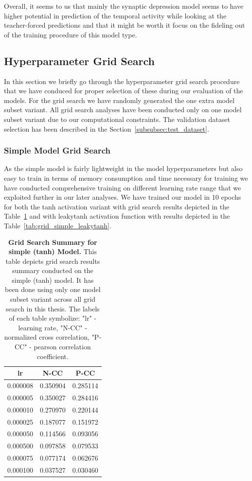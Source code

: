 Overall, it seems to us that mainly the synaptic depression model seems to have higher potential in prediction of the temporal activity while looking at the teacher-forced predictions and that it might be worth it focus on the fideling out of the training procedure of this model type.

\subsection{Hyperparameter Grid Search}
\label{subsec:hyperparameter_grid_search}

In this section we briefly go through the hyperparameter grid search procedure that we have conduced for proper selection of these during our evaluation of the models. For the grid search we have randomly generated the one extra model subset variant. All grid search analyses have been conducted only on one model subset variant due to our computational constraints. The validation dataset selection has been described in the Section~\ref{subsubsec:test_dataset}.

\subsubsection{Simple Model Grid Search}
\label{subsubsec:simple_model_grid_search}
As the simple model is fairly lightweight in the model hyperparameters but also easy to train in terms of memory consumption and time necessary for training we have conducted comprehensive training on different learning rate range that we exploited further in our later analyses. We have trained our model in 10 epochs for both the tanh activation variant with grid search results depicted in the Table~\ref{tab:grid_simple_tanh} and with leakytanh activation function with results depicted in the Table~\ref{tab:grid_simple_leakytanh}.

\begin{table}
    \centering\footnotesize\sf
    \begin{tabular}{ccc}
    \toprule
    lr & N-CC & P-CC \\
    \midrule
    0.000008 & 0.350904 & 0.285114 \\
    0.000005 & 0.350027 & 0.284416 \\
    0.000010 & 0.270970 & 0.220144 \\
    0.000025 & 0.187077 & 0.151972 \\
    0.000050 & 0.114566 & 0.093056 \\
    0.000500 & 0.097858 & 0.079533 \\
    0.000075 & 0.077174 & 0.062676 \\
    0.000100 & 0.037527 & 0.030460 \\
    \bottomrule
    \end{tabular}
    \caption{\textbf{Grid Search Summary for simple (tanh) Model.} This table depicts grid search results summary conducted on the simple (tanh) model. It has been done using only one model subset variant across all grid search in this thesis. The labels of each table symbolize: "lr" - learning rate, "N-CC" - normalized cross correlation, "P-CC" - pearson correlation coefficient.}
    \label{tab:grid_simple_tanh}
\end{table}


